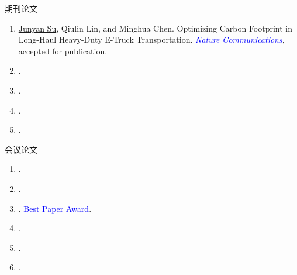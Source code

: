 \documentclass{resume} %
\begin{document}
\begin{rSection}{期刊论文}
    \begin{enumerate}
        \item \underline{Junyan Su}, Qiulin Lin, and Minghua Chen. Optimizing Carbon Footprint in Long-Haul Heavy-Duty E-Truck Transportation. \textcolor{blue}{\textit{Nature Communications}}, accepted for publication. 
        \item {}.
        \item {}.
        \item {}.
        \item {}.
    \end{enumerate}
\end{rSection}

\begin{rSection}{会议论文}
    
    \begin{enumerate}
         \item {}.
         \item {}.
         \item {}. \textcolor{blue}{Best Paper Award}.
        \item {}.
        \item {}.
        \item {}.
    \end{enumerate}
\end{rSection}
\end{document}

